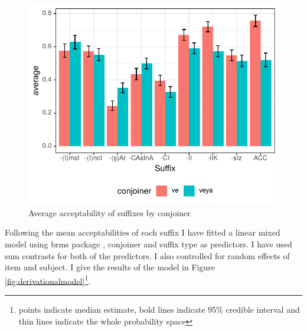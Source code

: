 \begin{knitrout}
\color{fgcolor}\begin{figure}[hbt!]

{\centering \includegraphics[]{figure/suffixacceptability-1} 

}

\caption[Average acceptability of suffixes by conjoiner]{Average acceptability of suffixes by conjoiner}\label{fig:suffixacceptability}
\end{figure}


\end{knitrout}

Following the mean acceptabilities of each suffix I have fitted a linear mixed model using brms package \citep{burkner2017brms},  conjoiner and suffix type as predictors. I have used sum contrasts for both of the predictors. I also controlled for random effects of item and subject. I give the results of the model in Figure \ref{fig:derivationalmodel}\footnote{points indicate median estimate, bold lines indicate 95\% credible interval and thin lines indicate the whole probability space}. 

